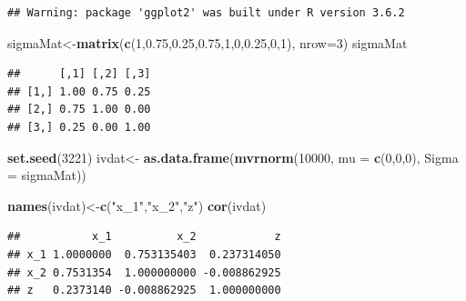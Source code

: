 \documentclass[
]{article}
\newenvironment{Shaded}{\begin{snugshade}}{\end{snugshade}}
\newcommand{\DataTypeTok}[1]{\textcolor[rgb]{0.13,0.29,0.53}{#1}}
\newcommand{\DecValTok}[1]{\textcolor[rgb]{0.00,0.00,0.81}{#1}}
\newcommand{\FloatTok}[1]{\textcolor[rgb]{0.00,0.00,0.81}{#1}}
\newcommand{\KeywordTok}[1]{\textcolor[rgb]{0.13,0.29,0.53}{\textbf{#1}}}
\newcommand{\NormalTok}[1]{#1}
\newcommand{\StringTok}[1]{\textcolor[rgb]{0.31,0.60,0.02}{#1}}
\begin{document}
\begin{verbatim}
## Warning: package 'ggplot2' was built under R version 3.6.2
\end{verbatim}

\begin{Shaded}
\begin{Highlighting}[]
\NormalTok{sigmaMat\textless{}{-}}\KeywordTok{matrix}\NormalTok{(}\KeywordTok{c}\NormalTok{(}\DecValTok{1}\NormalTok{,}\FloatTok{0.75}\NormalTok{,}\FloatTok{0.25}\NormalTok{,}\FloatTok{0.75}\NormalTok{,}\DecValTok{1}\NormalTok{,}\DecValTok{0}\NormalTok{,}\FloatTok{0.25}\NormalTok{,}\DecValTok{0}\NormalTok{,}\DecValTok{1}\NormalTok{), }\DataTypeTok{nrow=}\DecValTok{3}\NormalTok{)}
\NormalTok{sigmaMat}
\end{Highlighting}
\end{Shaded}

\begin{verbatim}
##      [,1] [,2] [,3]
## [1,] 1.00 0.75 0.25
## [2,] 0.75 1.00 0.00
## [3,] 0.25 0.00 1.00
\end{verbatim}

\begin{Shaded}
\begin{Highlighting}[]
\KeywordTok{set.seed}\NormalTok{(}\DecValTok{3221}\NormalTok{)}
\NormalTok{ivdat\textless{}{-}}\StringTok{ }\KeywordTok{as.data.frame}\NormalTok{(}\KeywordTok{mvrnorm}\NormalTok{(}\DecValTok{10000}\NormalTok{, }\DataTypeTok{mu =} \KeywordTok{c}\NormalTok{(}\DecValTok{0}\NormalTok{,}\DecValTok{0}\NormalTok{,}\DecValTok{0}\NormalTok{), }
                     \DataTypeTok{Sigma =}\NormalTok{ sigmaMat))}

\KeywordTok{names}\NormalTok{(ivdat)\textless{}{-}}\KeywordTok{c}\NormalTok{(}\StringTok{"x\_1"}\NormalTok{,}\StringTok{"x\_2"}\NormalTok{,}\StringTok{"z"}\NormalTok{)}
\KeywordTok{cor}\NormalTok{(ivdat)}
\end{Highlighting}
\end{Shaded}

\begin{verbatim}
##           x_1          x_2            z
## x_1 1.0000000  0.753135403  0.237314050
## x_2 0.7531354  1.000000000 -0.008862925
## z   0.2373140 -0.008862925  1.000000000
\end{verbatim}
\end{document}
